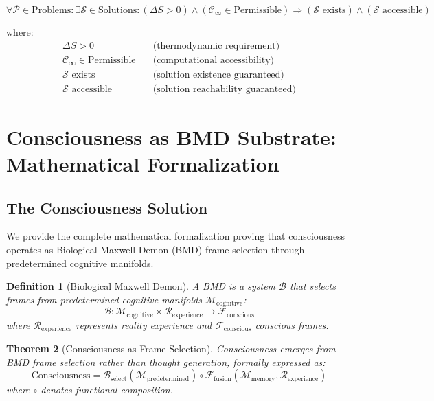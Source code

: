 \documentclass[12pt,a4paper]{article}
\newtheorem{theorem}{Theorem}[section]
\newtheorem{definition}[theorem]{Definition}
\begin{document}
\begin{equation}
\boxed{
\forall \mathcal{P} \in \text{Problems} : \exists \mathcal{S} \in \text{Solutions} : 
(\Delta S > 0) \wedge (\mathcal{C}_{\infty} \in \text{Permissible}) \Rightarrow (\mathcal{S} \text{ exists}) \wedge (\mathcal{S} \text{ accessible})
}
\end{equation}

where:
\begin{align}
\Delta S > 0 &\quad \text{(thermodynamic requirement)} \\
\mathcal{C}_{\infty} \in \text{Permissible} &\quad \text{(computational accessibility)} \\
\mathcal{S} \text{ exists} &\quad \text{(solution existence guaranteed)} \\
\mathcal{S} \text{ accessible} &\quad \text{(solution reachability guaranteed)}
\end{align}

\section{Consciousness as BMD Substrate: Mathematical Formalization}

\subsection{The Consciousness Solution}

We provide the complete mathematical formalization proving that consciousness operates as Biological Maxwell Demon (BMD) frame selection through predetermined cognitive manifolds.

\begin{definition}[Biological Maxwell Demon]
A BMD is a system $\mathcal{B}$ that selects frames from predetermined cognitive manifolds $\mathcal{M}_{\text{cognitive}}$:
\begin{equation}
\mathcal{B}: \mathcal{M}_{\text{cognitive}} \times \mathcal{R}_{\text{experience}} \to \mathcal{F}_{\text{conscious}}
\end{equation}
where $\mathcal{R}_{\text{experience}}$ represents reality experience and $\mathcal{F}_{\text{conscious}}$ conscious frames.
\end{definition}

\begin{theorem}[Consciousness as Frame Selection]
Consciousness emerges from BMD frame selection rather than thought generation, formally expressed as:
\begin{equation}
\text{Consciousness} = \mathcal{B}_{\text{select}}(\mathcal{M}_{\text{predetermined}}) \circ \mathcal{F}_{\text{fusion}}(\mathcal{M}_{\text{memory}}, \mathcal{R}_{\text{experience}})
\end{equation}
where $\circ$ denotes functional composition.
\end{theorem}
\end{document}
